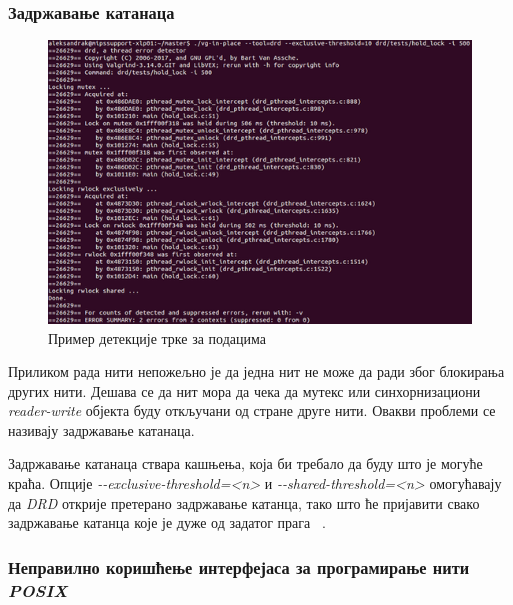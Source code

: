 \documentclass[12pt,oneside]{memoir}
\begin{document}
\subsubsection{Задржавање катанаца}

\begin{figure}[h!]
\begin{center}
\includegraphics[scale=0.75]{slika21.png}
\end{center}
\caption{ Пример детекције трке за подацима}
\label{fig:drd-data-race}
\end{figure}

\indent Приликом рада нити непожељно је да једна нит не може да ради због блокирања других нити. Дешава се да нит мора да чека да мутекс или синхорнизациони \textit{reader-write} објекта буду откључани од стране друге нити. Овакви проблеми се називају задржавање катанаца.

\indent Задржавање катанаца ствара кашњења, која би требало да буду што је могуће краћа. Опције \textit{-\--exclusive-threshold=<n>} и \textit{-\--shared-threshold=<n>} омогућавају да \textit{DRD} открије претерано задржавање катанца, тако што ће пријавити свако задржавање катанца које је дуже од задатог прага ~\cite{drdRef}.

\subsubsection{Неправилно коришћење интерфејаса за програмирање нити \textit{POSIX}}
\end{document}
